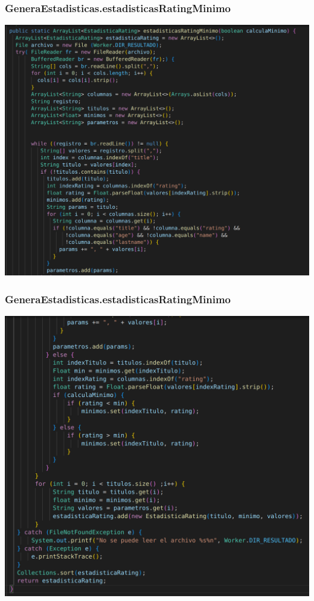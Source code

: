 \documentclass{beamer}
\begin{document}
\begin{frame}
\frametitle{GeneraEstadisticas.estadisticasRatingMinimo}
\includegraphics[width=0.9\linewidth]{generaestadisticas_estadisticasratingminimo1}
\end{frame}

\begin{frame}
\frametitle{GeneraEstadisticas.estadisticasRatingMinimo}
\includegraphics[width=0.9\linewidth]{generaestadisticas_estadisticasratingminimo2}
\end{frame}
\end{document}
